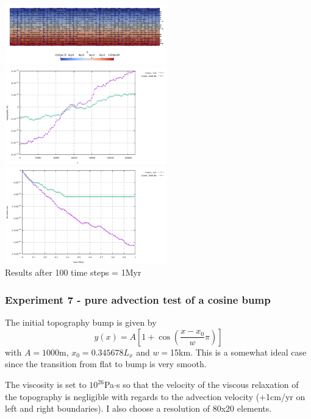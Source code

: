 \begin{center}
\includegraphics[width=7cm]{python_codes/fieldstone_54/images/exp6/velp}\\
\includegraphics[width=7cm]{python_codes/fieldstone_54/images/exp6/surface.pdf}
\includegraphics[width=7cm]{python_codes/fieldstone_54/images/exp6/elevation.pdf}\\
{\scriptsize Results after 100 time steps = 1Myr}
\end{center}

\subsubsection*{Experiment 7 - pure advection test of a cosine bump}

The initial topography bump is given by
\[
y(x)=A \left[ 1+ \cos \left( \frac{x-x_0}{w} \pi \right) \right]
\]
with $A=1000$m, $x_0=0.345678L_x$ and $w=$15km. This is a somewhat ideal case 
since the transition from flat to bump is very smooth.

The viscosity is set to $10^{26}$Pa$\cdot$s so that the velocity of the 
viscous relaxation of the topography is negligible with regards to the advection velocity
(+1cm/yr on left and right boundaries). I also choose a resolution of 80x20 elements.

